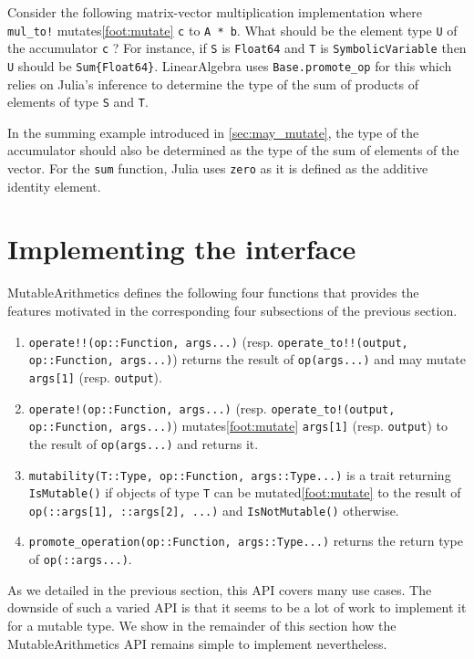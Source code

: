 \documentclass{juliacon}
\newcommand{\ma}{MutableArithmetics}
\begin{document}
Consider the following matrix-vector multiplication implementation
where \lstinline|mul_to!| mutates\cref{foot:mutate} \lstinline|c| to \lstinline|A * b|.
What should be the element type \lstinline|U| of the accumulator \lstinline|c| ?
For instance, if \lstinline|S| is \lstinline|Float64|
and \lstinline|T| is \lstinline|SymbolicVariable|
then \lstinline|U| should be \lstinline|Sum{Float64}|.
LinearAlgebra uses \lstinline|Base.promote_op| for this which relies on Julia's inference
to determine the type of the sum of products of elements of type \lstinline|S| and \lstinline|T|.

In the summing example introduced in \cref{sec:may_mutate},
the type of the accumulator should also be determined as the type of the sum of elements of the vector.
For the \lstinline|sum| function, Julia uses \lstinline|zero| as it is defined as
the additive identity element.

\section{Implementing the interface}
\label{sec:impl}

\ma{} defines the following four functions that provides the features motivated in the corresponding four subsections of the previous section.
\begin{enumerate}
  \item \lstinline|operate!!(op::Function, args...)| (resp. \lstinline|operate_to!!(output, op::Function, args...)|) returns the result of \lstinline|op(args...)| and may mutate \lstinline|args[1]| (resp. \lstinline|output|).
  \item \lstinline|operate!(op::Function, args...)| (resp. \lstinline|operate_to!(output, op::Function, args...)|) mutates\cref{foot:mutate} \lstinline|args[1]| (resp. \lstinline|output|) to the result of \lstinline|op(args...)| and returns it.
  \item \lstinline|mutability(T::Type, op::Function, args::Type...)| is a trait returning \lstinline|IsMutable()| if objects of type \lstinline|T| can be mutated\cref{foot:mutate} to the result of \lstinline|op(::args[1], ::args[2], ...)| and \lstinline|IsNotMutable()| otherwise.
  \item \lstinline|promote_operation(op::Function, args::Type...)| returns the return type of \lstinline|op(::args...)|.
\end{enumerate}

As we detailed in the previous section, this API covers many use cases.
The downside of such a varied API is that it seems to be a lot of work to implement it for a mutable type.
We show in the remainder of this section how the \ma{} API remains simple to implement nevertheless.
\end{document}
